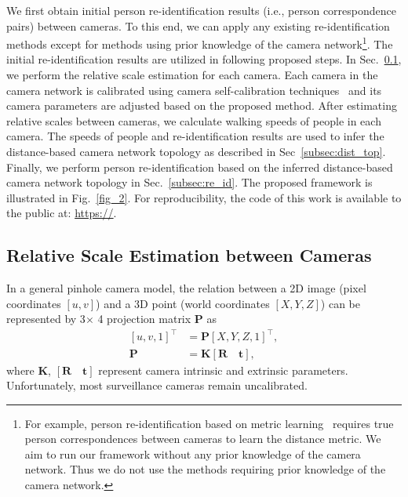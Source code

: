 \documentclass[10pt,twocolumn,letterpaper]{article}
\begin{document}
	We first obtain initial person re-identification results (i.e., person correspondence pairs) between cameras.
	To this end, we can apply any existing re-identification methods except for methods using prior knowledge of the camera network\footnote{For example, person re-identification based on metric learning~\cite{koestinger2012large, dikmen2011pedestrian} requires true person correspondences between cameras to learn the distance metric. We aim to run our framework without any prior knowledge of the camera network. Thus we do not use the methods requiring prior knowledge of the camera network.}.
	The initial re-identification results are utilized in following proposed steps.
	In Sec.~\ref{subsec:scale}, we perform the relative scale estimation for each camera. Each camera in the camera network is calibrated using camera self-calibration techniques~\cite{liu2011surveillance, lv2006camera} and its camera parameters are adjusted based on the proposed method.
	After estimating relative scales between cameras, we calculate walking speeds of people in each camera. The speeds of people and re-identification results are used to infer the distance-based camera network topology as described in Sec~\ref{subsec:dist_top}.
	Finally, we perform person re-identification based on the inferred distance-based camera network topology in Sec.~\ref{subsec:re_id}.
	The proposed framework is illustrated in Fig.~\ref{fig_2}.
	For reproducibility, the code of this work is available to the public at: {\url{https://}}.
	
	
	\subsection{Relative Scale Estimation between Cameras}
	\label{subsec:scale}
	
	In a general pinhole camera model, the relation between a 2D image (pixel coordinates $[u,v]$) and a 3D point (world coordinates $[X,Y,Z]$) can be represented by 3$\times$ 4 projection matrix $\mathbf{P}$ as 
	\begin{equation}
	\begin{split}
	\left[ u, v, 1 \right]^{\top} & = \mathbf{P} \left[ X, Y, Z, 1 \right]^{\top}, \\
	\mathbf{P} &= \mathbf{K}\left[ \mathbf{R} \quad \mathbf{t} \right],
	\end{split}
	\end{equation}
	where $\mathbf{K}$, $\left[\mathbf{R} \quad \mathbf{t}\right]$ represent camera intrinsic and extrinsic parameters.
	Unfortunately, most surveillance cameras remain uncalibrated.
	
\end{document}
